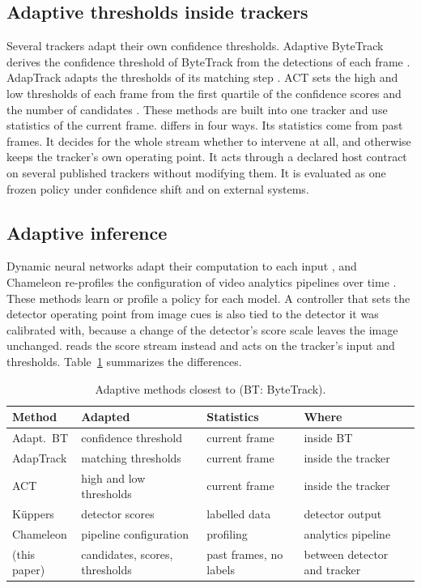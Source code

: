 \subsection{Adaptive thresholds inside trackers}
Several trackers adapt their own confidence thresholds. Adaptive ByteTrack
derives the confidence threshold of ByteTrack from the detections of each
frame \cite{ma2023adaptivebytetrack}. AdapTrack adapts the thresholds of its
matching step \cite{shim2024adaptrack}. ACT sets the high and low thresholds
of each frame from the first quartile of the confidence scores and the number
of candidates \cite{act2026adaptive}. These methods are built into one tracker
and use statistics of the current frame. \scl{} differs in
four ways. Its statistics come from past frames. It decides for the whole
stream whether to intervene at all, and otherwise keeps the tracker's own
operating point. It acts through a declared host contract on several
published trackers without modifying them. It is evaluated as one frozen
policy under confidence shift and on external systems.

\subsection{Adaptive inference}
Dynamic neural networks adapt their computation to each input
\cite{han2022dynamic}, and Chameleon re-profiles the configuration of video
analytics pipelines over time \cite{jiang2018chameleon}. These methods learn or
profile a policy for each model. A controller that sets the detector operating
point from image cues is also tied to the detector it was calibrated with,
because a change of the detector's score scale leaves the image unchanged.
\scl{} reads the score stream instead and acts on the
tracker's input and thresholds. Table~\ref{tab:related} summarizes the
differences.

\begin{table}[t]
\caption{Adaptive methods closest to \scl{} (BT: ByteTrack).}
\label{tab:related}
\centering\footnotesize
\setlength{\tabcolsep}{3pt}
\begin{tabular}{@{}>{\raggedright\arraybackslash}p{17mm}>{\raggedright\arraybackslash}p{18mm}>{\raggedright\arraybackslash}p{15mm}>{\raggedright\arraybackslash}p{18mm}@{}}
\toprule
Method & Adapted & Statistics & Where\\
\midrule
Adapt.\ BT \cite{ma2023adaptivebytetrack} & confidence threshold & current frame & inside BT\\
AdapTrack \cite{shim2024adaptrack} & matching thresholds & current frame & inside the tracker\\
ACT \cite{act2026adaptive} & high and low thresholds & current frame & inside the tracker\\
K{\"u}ppers \cite{kuppers2020detcalib} & detector scores & labelled data & detector output\\
Chameleon \cite{jiang2018chameleon} & pipeline configuration & profiling & analytics pipeline\\
\scl{} (this paper) & candidates, scores, thresholds & past frames, no labels & between detector and tracker\\
\bottomrule
\end{tabular}
\end{table}
